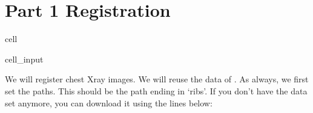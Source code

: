 \documentclass[letterpaper,10pt,english]{jupyterBook}
\begin{document}
\section{Part 1 \sphinxhyphen{} Registration}
\label{\detokenize{notebooks/Tutorial6_Registration/Tutorial6_Registration_student:part-1-registration}}
\begin{sphinxuseclass}{cell}\begin{sphinxVerbatimInput}

\begin{sphinxuseclass}{cell_input}
\begin{sphinxVerbatim}[commandchars=\\\{\}]
 
   
   
 
 
\end{sphinxVerbatim}

\end{sphinxuseclass}\end{sphinxVerbatimInput}

\end{sphinxuseclass}
\sphinxAtStartPar
We will register chest X\sphinxhyphen{}ray images. We will reuse the data of . As always, we first set the paths. This should be the path ending in ‘ribs’. If you don’t have the data set anymore, you can download it using the lines below:
\end{document}
